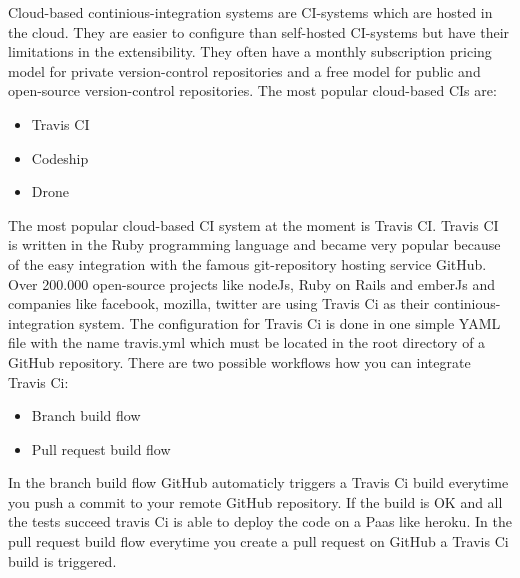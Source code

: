 Cloud-based continious-integration systems are CI-systems which are hosted in the cloud. They are easier to configure than self-hosted CI-systems but have their limitations in the extensibility. They often have a monthly subscription pricing model for private version-control repositories and a free model for public and open-source version-control repositories. The most popular cloud-based CIs are:
\begin{itemize} 
    \item Travis CI 
    \item Codeship 
    \item Drone
\end{itemize}
The most popular cloud-based CI system at the moment is Travis CI. Travis CI is written in the Ruby programming language and became very popular because of the easy integration with the famous git-repository hosting service GitHub. Over 200.000 open-source projects like nodeJs, Ruby on Rails and emberJs and companies like facebook, mozilla, twitter are using Travis Ci as their continious-integration system. The configuration for Travis Ci is done in one simple YAML file with the name travis.yml which must be located in the root directory of a GitHub repository. There are two possible workflows how you can integrate Travis Ci:
\begin{itemize} 
    \item Branch build flow
    \item Pull request build flow
\end{itemize}
In the branch build flow GitHub automaticly triggers a Travis Ci build everytime you push a commit to your remote GitHub repository. If the build is OK and all the tests succeed travis Ci is able to deploy the code on a Paas like heroku. In the pull request build flow everytime you create a pull request on GitHub a Travis Ci build is triggered.
